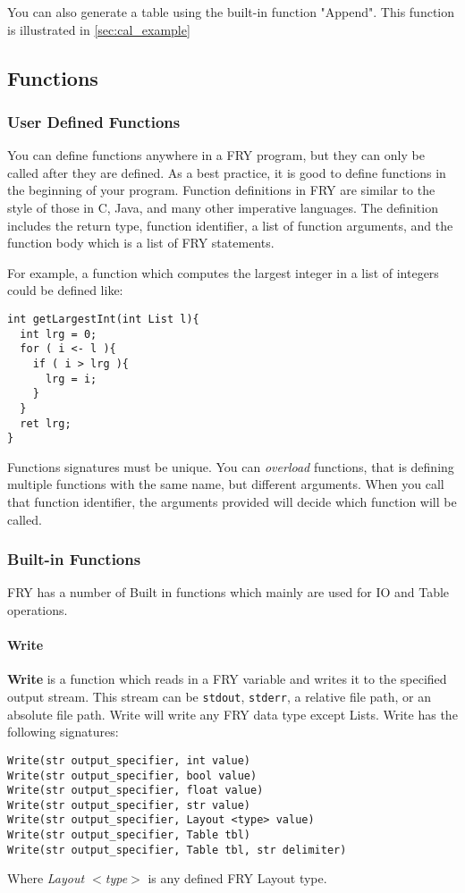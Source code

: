 \documentclass{article}
\begin{document}
You can also generate a table using the built-in function "Append". This function is illustrated in \ref{sec:cal_example}

\subsection{Functions}
\subsubsection{User Defined Functions}
You can define functions anywhere in a FRY program, but they can only be called after they are defined. As a best practice, it is good to define functions in the beginning of your program. Function definitions in FRY are similar to the style of those in C, Java, and many other imperative languages. The definition includes the return type, function identifier, a list of function arguments, and the function body which is a list of FRY statements. 

For example, a function which computes the largest integer in a list of integers could be defined like:
\begin{lstlisting}
int getLargestInt(int List l){                                                              
  int lrg = 0;
  for ( i <- l ){
    if ( i > lrg ){
      lrg = i;
    }
  }
  ret lrg;
}
\end{lstlisting}

Functions signatures must be unique. You can \emph{overload} functions, that is defining multiple functions with the same name, but different arguments. When you call that function identifier, the arguments provided will decide which function will be called.
\subsubsection{Built-in Functions}
FRY has a number of Built in functions which mainly are used for IO and Table operations.
\paragraph{Write}
\textbf{Write} is a function which reads in a FRY variable and writes it to the specified output stream. This stream can be \texttt{stdout}, \texttt{stderr}, a relative file path, or an absolute file path. Write will write any FRY data type except Lists. Write has the following signatures:
\begin{lstlisting}
Write(str output_specifier, int value)
Write(str output_specifier, bool value)
Write(str output_specifier, float value)
Write(str output_specifier, str value)
Write(str output_specifier, Layout <type> value)
Write(str output_specifier, Table tbl)
Write(str output_specifier, Table tbl, str delimiter)
\end{lstlisting}
Where \emph{Layout $<$type$>$} is any defined FRY Layout type.
   
\end{document}
